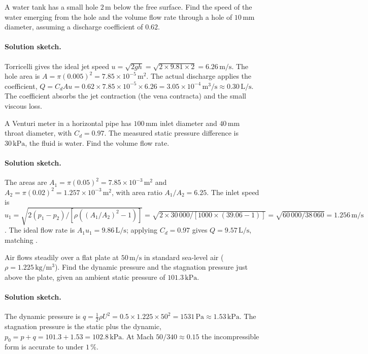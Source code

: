 \begin{exercise}
A water tank has a small hole $2\,\si{\meter}$ below the free
surface. Find the speed of the water emerging from the hole and
the volume flow rate through a hole of $10\,\si{\milli\meter}$
diameter, assuming a discharge coefficient of $0.62$.

\paragraph{Solution sketch.} Torricelli gives the ideal jet speed
$u = \sqrt{2gh} = \sqrt{2\times 9.81\times 2} =
6.26\,\si{\meter\per\second}$. The hole area is $A = \pi(0.005)^2 =
7.85\times 10^{-5}\,\si{\meter}^2$. The actual discharge applies the
coefficient, $Q = C_d A u = 0.62\times 7.85\times 10^{-5}\times 6.26
= 3.05\times 10^{-4}\,\si{\meter\cubed\per\second} \approx
0.30\,\text{L/s}$. The coefficient absorbs the jet contraction (the
vena contracta) and the small viscous loss.
\end{exercise}

\begin{exercise}
A Venturi meter in a horizontal pipe has $100\,\si{\milli\meter}$
inlet diameter and $40\,\si{\milli\meter}$ throat diameter, with
$C_d = 0.97$. The measured static pressure difference is
$30\,\text{kPa}$, the fluid is water. Find the volume flow rate.

\paragraph{Solution sketch.} The areas are $A_1 = \pi(0.05)^2 =
7.85\times 10^{-3}\,\si{\meter}^2$ and $A_2 = \pi(0.02)^2 = 1.257
\times 10^{-3}\,\si{\meter}^2$, with area ratio $A_1/A_2 = 6.25$. The
inlet speed is $u_1 = \sqrt{2(p_1 - p_2)/[\rho((A_1/A_2)^2 - 1)]} =
\sqrt{2\times 30\,000/[1000\times(39.06 - 1)]} = \sqrt{60\,000/38\,060}
= 1.256\,\si{\meter\per\second}$. The ideal flow rate is $A_1 u_1 =
9.86\,\text{L/s}$; applying $C_d = 0.97$ gives $Q = 9.57\,\text{L/s}$,
matching .
\end{exercise}

\begin{exercise}
Air flows steadily over a flat plate at $50\,\si{\meter\per\second}$
in standard sea-level air ($\rho = 1.225\,\si{\kilogram\per\meter
\cubed}$). Find the dynamic pressure and the stagnation pressure
just above the plate, given an ambient static pressure of
$101.3\,\text{kPa}$.

\paragraph{Solution sketch.} The dynamic pressure is $q = \tfrac12
\rho U^2 = 0.5\times 1.225\times 50^2 = 1531\,\text{Pa} \approx
1.53\,\text{kPa}$. The stagnation pressure is the static plus the
dynamic, $p_0 = p + q = 101.3 + 1.53 = 102.8\,\text{kPa}$. At Mach
$50/340 \approx 0.15$ the incompressible form is accurate to under
$1\,\%$.
\end{exercise}

